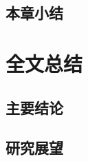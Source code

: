 \section{本章小结}

\zhlipsum[6]

\chapter{全文总结}

\section{主要结论}

\zhlipsum[7]

\section{研究展望}

\zhlipsum[8]

